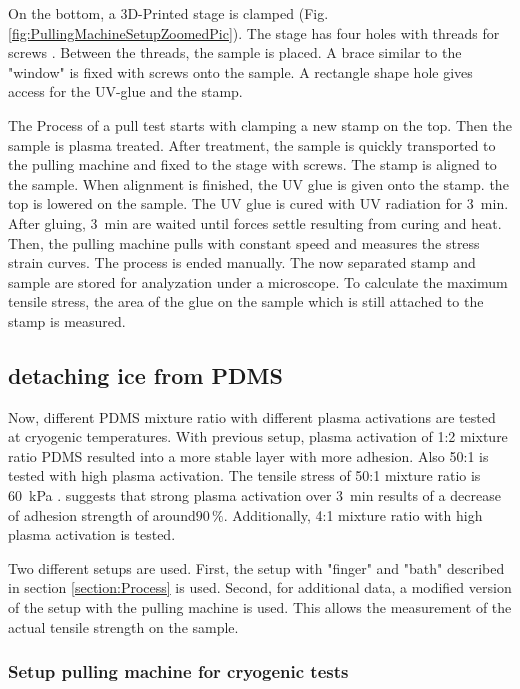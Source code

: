 On the bottom, a 3D-Printed stage is clamped (Fig. \ref{fig:PullingMachineSetupZoomedPic}). The stage has four holes with threads for screws . Between the threads, the sample is placed. A brace similar to the "window" is fixed with screws onto the sample. A rectangle shape hole gives access for the UV-glue and the stamp. 

The Process of a pull test starts with clamping a new stamp on the top. Then the sample is plasma treated. After treatment, the sample is quickly transported to the pulling machine and fixed to the stage with screws. The stamp is aligned to the sample. When alignment is finished, the UV glue is given onto the stamp. the top is lowered on the sample. The UV glue is cured with UV radiation for \SI{3}{\minute}. After gluing, \SI{3}{\minute} are waited until forces settle resulting from curing and heat. Then, the pulling machine pulls with constant speed and measures the stress strain curves. The process is ended manually. The now separated stamp and sample are stored for analyzation under a microscope. To calculate the maximum tensile stress, the area of the glue on the sample which is still attached to the stamp is measured.

\subsection{detaching ice from PDMS}

Now, different PDMS mixture ratio with different plasma activations are tested at cryogenic temperatures. With previous setup, plasma activation of 1:2 mixture ratio PDMS resulted into a more stable layer with more adhesion. Also 50:1 is tested with high plasma activation. The tensile stress of 50:1 mixture ratio is \SI{60}{\kilo\pascal} \cite{IbanezIbanez.2022}.  \cite{Ohishi.2017} suggests that strong plasma activation over \SI{3}{\minute} results of a decrease of adhesion strength of around$90\,\%$. Additionally, 4:1 mixture ratio with high plasma activation is tested.

Two different setups are used. First, the setup with "finger" and "bath" described in section \ref{section:Process} is used. Second, for additional data, a modified version of the setup with the pulling machine is used. This allows the measurement of the actual tensile strength on the sample. 

\subsubsection{Setup pulling machine for cryogenic tests}

